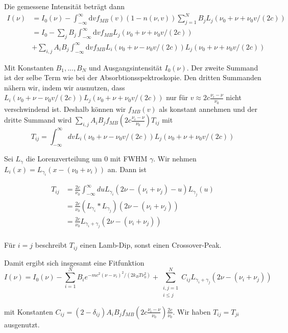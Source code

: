 \documentclass[a4paper,parskip]{scrartcl}
\begin{document}
 Die gemessene Intensität beträgt dann
\begin{align*}
I(\nu) &= I_0(\nu)-\int_{-\infty}^{\infty} \mathrm{d}v f_{MB}(v)(1-n(\nu, v))\sum_{j=1}^N B_j L_j(\nu_0+\nu+\nu_0 v/(2c)) \\
&= I_0 -\sum_j B_j \int_{-\infty}^{\infty} \mathrm{d}v f_{MB} L_j(\nu_0+\nu+\nu_0 v/(2c)) \\
&+\sum_{i,j} A_iB_j \int_{-\infty}^{\infty} \mathrm{d}v f_{MB} L_i(\nu_0+\nu-\nu_0 v/(2c)) L_j(\nu_0+\nu+\nu_0 v/(2c))
\end{align*}

Mit Konstanten $B_1, ..., B_N$ und Ausgangsintensität $I_0(\nu)$. Der zweite Summand ist der selbe Term wie bei der Absorbtionsspektroskopie. Den dritten Summanden nähern wir, indem wir ausnutzen, dass  $L_i(\nu_0+\nu-\nu_0 v/(2c)) L_j(\nu_0+\nu+\nu_0 v/(2c))$ nur für $v \approx 2c \frac{\nu_i-\nu}{\nu_0}$ nicht verschwindend ist. Deshalb können wir $f_{MB}(v)$ als konstant annehmen und der dritte Summand wird $\sum_{i,j} A_iB_j f_{MB}(2c \frac{\nu_i-\nu}{\nu_0}) T_{ij}$ mit
$$T_{ij}=\int_{-\infty}^\infty dv L_i(\nu_0+\nu-\nu_0 v/(2c)) L_j(\nu_0+\nu+\nu_0 v/(2c))$$


Sei $L_\gamma$ die Lorenzverteilung um 0 mit FWHM $\gamma$. Wir nehmen $L_i(x) = L_{\gamma_i}(x-(\nu_0+\nu_i))$ an. Dann ist

\begin{align*}
T_{ij} &= \frac{2c}{\nu_0}\int_{-\infty}^\infty du L_{\gamma_i}(2\nu-(\nu_i+\nu_j)-u)L_{\gamma_j}(u)\\
&= \frac{2c}{\nu_0} (L_{\gamma_i} * L_{\gamma_j})(2\nu-(\nu_i+\nu_j)) \\
&= \frac{2c}{\nu_0} L_{\gamma_i+\gamma_j}(2\nu-(\nu_i+\nu_j)) \\
\end{align*}

Für $i=j$ beschreibt $T_{ij}$ einen Lamb-Dip, sonst einen Crossover-Peak. 

Damit ergibt sich insgesamt eine Fitfunktion
\begin{equation}
I(\nu) = I_0(\nu)-\sum_{i=1}^N B_i e^{-mc^2(\nu-\nu_i)^2/(2k_BT\nu_0^2)} +\sum_{\substack{i,j=1\\i\leq j}}^N C_{ij} L_{\gamma_i+\gamma_j}(2\nu-(\nu_i+\nu_j))
\label{SaettigungsFit1}
\end{equation}


mit Konstanten $C_{ij} = (2-\delta_{ij})A_iB_jf_{MB}(2c \frac{\nu_i-\nu}{\nu_0})\frac{2c}{\nu_0}$. Wir haben $T_{ij}=T_{ji}$ ausgenutzt.\\
\end{document}
